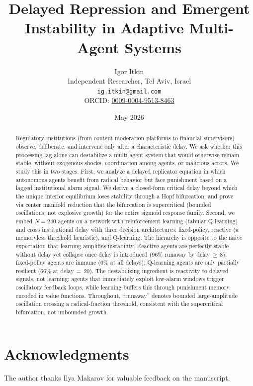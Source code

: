 \documentclass[11pt]{article}
\title{Delayed Repression and Emergent Instability in Adaptive Multi-Agent Systems}
\author{Igor Itkin\\
\small Independent Researcher, Tel Aviv, Israel\\
\small \texttt{ig.itkin@gmail.com}\\
\small ORCID: \href{https://orcid.org/0009-0004-9513-8463}{0009-0004-9513-8463}}
\date{May 2026}
\begin{document}
\maketitle

\begin{abstract}
Regulatory institutions (from content moderation platforms to financial supervisors) observe, deliberate, and intervene only after a characteristic delay. We ask whether this processing lag alone can destabilize a multi-agent system that would otherwise remain stable, without exogenous shocks, coordination among agents, or malicious actors. We study this in two stages. First, we analyze a delayed replicator equation in which autonomous agents benefit from radical behavior but face punishment based on a lagged institutional alarm signal. We derive a closed-form critical delay beyond which the unique interior equilibrium loses stability through a Hopf bifurcation, and prove via center manifold reduction that the bifurcation is supercritical (bounded oscillations, not explosive growth) for the entire sigmoid response family. Second, we embed $N=240$ agents on a network with reinforcement learning (tabular Q-learning) and cross institutional delay with three decision architectures: fixed-policy, reactive (a memoryless threshold heuristic), and Q-learning. The hierarchy is opposite to the naive expectation that learning amplifies instability. Reactive agents are perfectly stable without delay yet collapse once delay is introduced (96\% runaway by delay$\,{\geq}\,8$); fixed-policy agents are immune (0\% at all delays); Q-learning agents are only partially resilient (66\% at delay$\,{=}\,20$). The destabilizing ingredient is reactivity to delayed signals, not learning: agents that immediately exploit low-alarm windows trigger oscillatory feedback loops, while learning buffers this through punishment memory encoded in value functions. Throughout, ``runaway'' denotes bounded large-amplitude oscillation crossing a radical-fraction threshold, consistent with the supercritical bifurcation, not unbounded growth.
\end{abstract}








\section*{Acknowledgments}
The author thanks Ilya Makarov for valuable feedback on the manuscript.




\appendix


\end{document}
